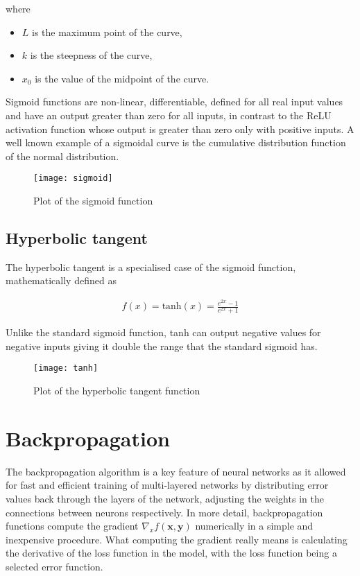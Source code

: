 where 
\begin{itemize}[nosep]
    \item[] $L$ is the maximum point of the curve,
    \item[] $k$ is the steepness of the curve,
    \item[] $x_0$ is the value of the midpoint of the curve. 
\end{itemize}

Sigmoid functions are non-linear, differentiable, defined for all real input values and have an output greater than zero for all inputs, in contrast to the ReLU activation function whose output is greater than zero only with positive inputs. A well known example of a sigmoidal curve is the cumulative distribution function of the normal distribution.

\begin{figure}[H]
    \centering
    \texttt{[image: sigmoid]}
    \caption{Plot of the sigmoid function}
    \label{tab:sigmoid}
\end{figure}

\subsection{Hyperbolic tangent}
The hyperbolic tangent is a specialised case of the sigmoid function, mathematically defined as 

\begin{align}
    f(x) = \text{tanh}(x) = \frac{e^{2x} - 1}{e^{2x} + 1}
\end{align}

Unlike the standard sigmoid function, tanh can output negative values for negative inputs giving it double the range that the standard sigmoid has.

\begin{figure}[H]
    \centering
    \texttt{[image: tanh]}
    \caption{Plot of the hyperbolic tangent function}
    \label{tab:tanh}
\end{figure}

\section{Backpropagation}
The backpropagation algorithm is a key feature of neural networks as it allowed for fast and efficient training of multi-layered networks by distributing error values back through the layers of the network, adjusting the weights in the connections between neurons respectively\cite{backprop}. In more detail, backpropagation functions compute the gradient $\nabla_{x}f(\mathbf{x}, \mathbf{y})$ numerically in a simple and inexpensive procedure\cite{rumelhart_backprop}. What computing the gradient really means is calculating the derivative of the loss function in the model, with the loss function being a selected error function.


